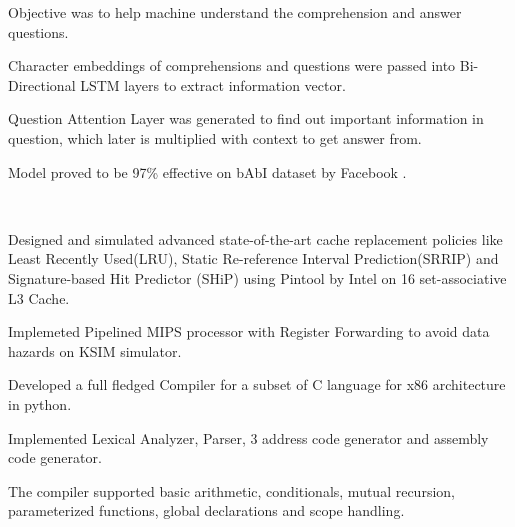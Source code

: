 \documentclass[]{deedy-resume-openfont}
\begin{document}
\begin{minipage}[t]{0.69\textwidth}
\begin{tightemize}
\item Objective was to help machine understand the comprehension and answer questions.
\item Character embeddings of comprehensions and questions were passed into Bi-Directional LSTM layers to extract information vector.
\item Question Attention Layer was generated to find out important information in question, which later is multiplied with context to get answer from. 
\item Model proved to be 97\% effective on bAbI dataset by Facebook .
\end{tightemize}

\\\hspace{0.5cm}

\begin{tightemize}
\item Designed and simulated advanced state-of-the-art cache replacement policies like Least Recently Used(LRU), Static Re-reference Interval Prediction(SRRIP) and Signature-based Hit Predictor (SHiP) using Pintool by Intel on 16 set-associative L3 Cache.
\item Implemeted Pipelined MIPS processor with Register Forwarding to avoid data hazards on KSIM simulator.
\end{tightemize}


\begin{tightemize}
\item Developed a full fledged Compiler for a subset of C language for x86 architecture in python.
\item Implemented Lexical Analyzer, Parser, 3 address code generator and assembly code generator.
\item The compiler supported basic arithmetic, conditionals, mutual recursion, parameterized functions, global declarations and scope handling.
\end{tightemize}




\end{minipage}
\end{document}
